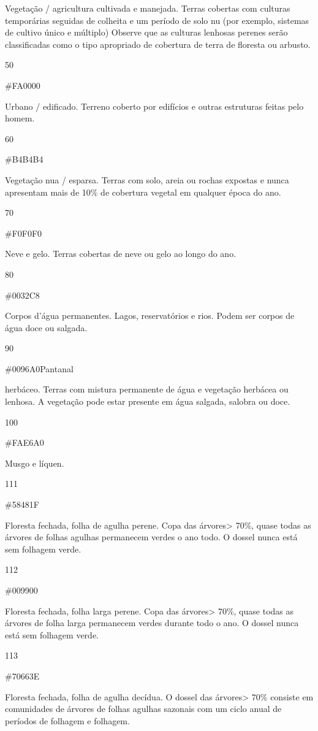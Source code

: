 \documentclass[
  portuguese,
]{krantz}
\begin{document}
Vegetação / agricultura cultivada e manejada. Terras cobertas com culturas temporárias seguidas de colheita e um período de solo nu (por exemplo, sistemas de cultivo único e múltiplo) Observe que as culturas lenhosas perenes serão classificadas como o tipo apropriado de cobertura de terra de floresta ou arbusto.

50

\#FA0000

Urbano / edificado. Terreno coberto por edifícios e outras estruturas feitas pelo homem.

60

\#B4B4B4

Vegetação nua / esparsa. Terras com solo, areia ou rochas expostas e nunca apresentam mais de 10\% de cobertura vegetal em qualquer época do ano.

70

\#F0F0F0

Neve e gelo. Terras cobertas de neve ou gelo ao longo do ano.

80

\#0032C8

Corpos d'água permanentes. Lagos, reservatórios e rios. Podem ser corpos de água doce ou salgada.

90

\#0096A0Pantanal

herbáceo. Terras com mistura permanente de água e vegetação herbácea ou lenhosa. A vegetação pode estar presente em água salgada, salobra ou doce.

100

\#FAE6A0

Musgo e líquen.

111

\#58481F

Floresta fechada, folha de agulha perene. Copa das árvores\textgreater{} 70\%, quase todas as árvores de folhas agulhas permanecem verdes o ano todo. O dossel nunca está sem folhagem verde.

112

\#009900

Floresta fechada, folha larga perene. Copa das árvores\textgreater{} 70\%, quase todas as árvores de folha larga permanecem verdes durante todo o ano. O dossel nunca está sem folhagem verde.

113

\#70663E

Floresta fechada, folha de agulha decídua. O dossel das árvores\textgreater{} 70\% consiste em comunidades de árvores de folhas agulhas sazonais com um ciclo anual de períodos de folhagem e folhagem.
\end{document}
